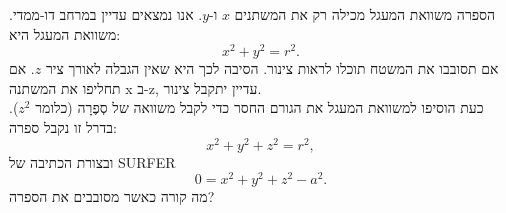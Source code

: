 \begin{surferPage}{הספרה}
משוואת המעגל מכילה רק את המשתנים $x$ ו-$y$. אנו נמצאים עדיין במרחב דו-ממדי.
משוואת המעגל היא:
\[x^2+y^2=r^2.\]
אם תסובבו את המשטח תוכלו לראות צינור. הסיבה לכך היא שאין הגבלה לאורך ציר $z$. אם תחליפו את המשתנה x ב-z, עדיין יתקבל צינור.\\
כעת הוסיפו למשוואת המעגל את הגורם החסר כדי לקבל משוואה של סְפֶרָה (כלומר $z^2$).
בדרל זו נקבל ספרה:
\[x^2+y^2+z^2=r^2,\]
ובצורת הכתיבה של SURFER
\[0=x^2+y^2+z^2-a^2.\]
מה קורה כאשר מסובבים את הספרה?
\end{surferPage}
